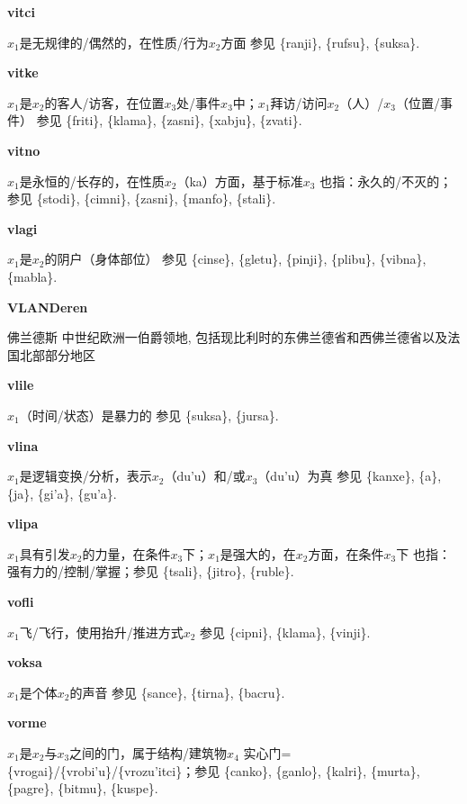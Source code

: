 \documentclass[notitlepage,twocolumn,a4paper,10pt]{book}
\begin{document}
{\sffamily\bfseries vitci}\enspace {\ttfamily\bfseries[vit]}  $x_1$是无规律的\slash{}偶然的，在性质\slash{}行为$x_2$方面 \textemdash{} 参见 \{ranji\}, \{rufsu\}, \{suksa\}.

{\sffamily\bfseries vitke}\enspace {\ttfamily\bfseries[        vi'e]}  $x_1$是$x_2$的客人\slash{}访客，在位置$x_3$处\slash{}事件$x_3$中；$x_1$拜访\slash{}访问$x_2$（人）\slash{}$x_3$（位置\slash{}事件） \textemdash{} 参见 \{friti\}, \{klama\}, \{zasni\}, \{xabju\}, \{zvati\}.

{\sffamily\bfseries vitno}\enspace {\ttfamily\bfseries[        vi'o]}  $x_1$是永恒的\slash{}长存的，在性质$x_2$（ka）方面，基于标准$x_3$ \textemdash{} 也指：永久的\slash{}不灭的；参见 \{stodi\}, \{cimni\}, \{zasni\}, \{manfo\}, \{stali\}.

{\sffamily\bfseries vlagi}\enspace {\ttfamily\bfseries[lag]}  $x_1$是$x_2$的阴户（身体部位） \textemdash{} 参见 \{cinse\}, \{gletu\}, \{pinji\}, \{plibu\}, \{vibna\}, \{mabla\}.

{\sffamily\bfseries VLANDeren} 佛兰德斯 \textemdash{} 中世纪欧洲一伯爵领地, 包括现比利时的东佛兰德省和西佛兰德省以及法国北部部分地区

{\sffamily\bfseries vlile}\enspace {\ttfamily\bfseries[vil]}  $x_1$（时间\slash{}状态）是暴力的 \textemdash{} 参见 \{suksa\}, \{jursa\}.

{\sffamily\bfseries vlina} $x_1$是逻辑变换\slash{}分析，表示$x_2$（du'u）和\slash{}或$x_3$（du'u）为真 \textemdash{} 参见 \{kanxe\}, \{a\}, \{ja\}, \{gi'a\}, \{gu'a\}.

{\sffamily\bfseries vlipa}\enspace {\ttfamily\bfseries[    vli]}  $x_1$具有引发$x_2$的力量，在条件$x_3$下；$x_1$是强大的，在$x_2$方面，在条件$x_3$下 \textemdash{} 也指：强有力的\slash{}控制\slash{}掌握；参见 \{tsali\}, \{jitro\}, \{ruble\}.

{\sffamily\bfseries vofli}  $x_1$飞\slash{}飞行，使用抬升\slash{}推进方式$x_2$ \textemdash{} 参见 \{cipni\}, \{klama\}, \{vinji\}.

{\sffamily\bfseries voksa}\enspace {\ttfamily\bfseries[vok     vo'a]}  $x_1$是个体$x_2$的声音 \textemdash{} 参见 \{sance\}, \{tirna\}, \{bacru\}.

{\sffamily\bfseries vorme}  $x_1$是$x_2$与$x_3$之间的门，属于结构\slash{}建筑物$x_4$ \textemdash{} 实心门=\{vrogai\}\slash{}\{vrobi'u\}\slash{}\{vrozu'itci\}；参见 \{canko\}, \{ganlo\}, \{kalri\}, \{murta\}, \{pagre\}, \{bitmu\}, \{kuspe\}.
\end{document}
